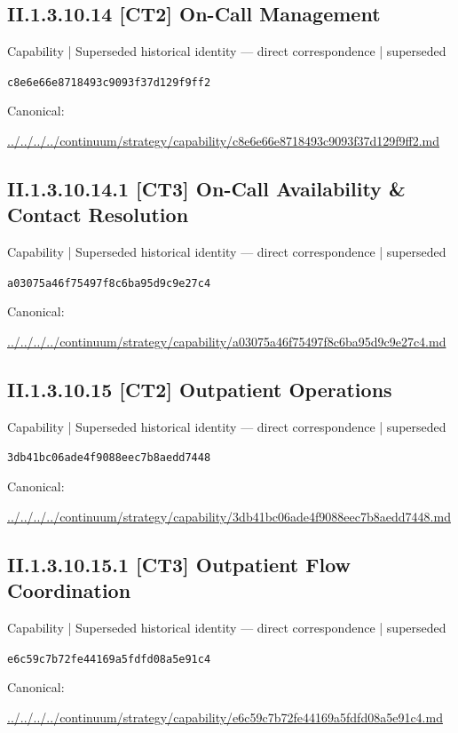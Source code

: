 \documentclass[10pt,a4paper]{article}
\begin{document}
\subsection*{II.1.3.10.14 [CT2] On-Call Management}
{\small Capability | Superseded historical identity — direct correspondence | superseded}\par
\texttt{c8e6e66e8718493c9093f37d129f9ff2}\par
Canonical: \par
{\footnotesize\url{../../../../continuum/strategy/capability/c8e6e66e8718493c9093f37d129f9ff2.md}}\par
\subsection*{II.1.3.10.14.1 [CT3] On-Call Availability \& Contact Resolution}
{\small Capability | Superseded historical identity — direct correspondence | superseded}\par
\texttt{a03075a46f75497f8c6ba95d9c9e27c4}\par
Canonical: \par
{\footnotesize\url{../../../../continuum/strategy/capability/a03075a46f75497f8c6ba95d9c9e27c4.md}}\par
\subsection*{II.1.3.10.15 [CT2] Outpatient Operations}
{\small Capability | Superseded historical identity — direct correspondence | superseded}\par
\texttt{3db41bc06ade4f9088eec7b8aedd7448}\par
Canonical: \par
{\footnotesize\url{../../../../continuum/strategy/capability/3db41bc06ade4f9088eec7b8aedd7448.md}}\par
\subsection*{II.1.3.10.15.1 [CT3] Outpatient Flow Coordination}
{\small Capability | Superseded historical identity — direct correspondence | superseded}\par
\texttt{e6c59c7b72fe44169a5fdfd08a5e91c4}\par
Canonical: \par
{\footnotesize\url{../../../../continuum/strategy/capability/e6c59c7b72fe44169a5fdfd08a5e91c4.md}}\par
\end{document}

